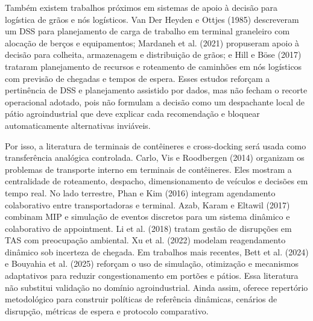 \documentclass[
  12pt,
  oneside,
  a4paper,
  sumario=tradicional,
  brazil
]{abntex2}
\begin{document}
Tamb\'em existem trabalhos pr\'oximos em sistemas de apoio \`a decis\~ao para log\'istica de gr\~aos e n\'os log\'isticos. Van Der Heyden e Ottjes (1985) descreveram um DSS para planejamento de carga de trabalho em terminal graneleiro com aloca\c{c}\~ao de ber\c{c}os e equipamentos; Mardaneh et al. (2021) propuseram apoio \`a decis\~ao para colheita, armazenagem e distribui\c{c}\~ao de gr\~aos; e Hill e B\"ose (2017) trataram planejamento de recursos e roteamento de caminh\~oes em n\'os log\'isticos com previs\~ao de chegadas e tempos de espera. Esses estudos refor\c{c}am a pertin\^encia de DSS e planejamento assistido por dados, mas n\~ao fecham o recorte operacional adotado, pois n\~ao formulam a decis\~ao como um despachante local de p\'atio agroindustrial que deve explicar cada recomenda\c{c}\~ao e bloquear automaticamente alternativas invi\'aveis.

Por isso, a literatura de terminais de cont\^eineres e cross-docking ser\'a usada como transfer\^encia anal\'ogica controlada. Carlo, Vis e Roodbergen (2014) organizam os problemas de transporte interno em terminais de cont\^eineres. Eles mostram a centralidade de roteamento, despacho, dimensionamento de ve\'iculos e decis\~oes em tempo real. No lado terrestre, Phan e Kim (2016) integram agendamento colaborativo entre transportadoras e terminal. Azab, Karam e Eltawil (2017) combinam MIP e simula\c{c}\~ao de eventos discretos para um sistema din\^amico e colaborativo de appointment. Li et al. (2018) tratam gest\~ao de disrup\c{c}\~oes em TAS com preocupa\c{c}\~ao ambiental. Xu et al. (2022) modelam reagendamento din\^amico sob incerteza de chegada. Em trabalhos mais recentes, Bett et al. (2024) e Bouyahia et al. (2025) refor\c{c}am o uso de simula\c{c}\~ao, otimiza\c{c}\~ao e mecanismos adaptativos para reduzir congestionamento em port\~oes e p\'atios. Essa literatura n\~ao substitui valida\c{c}\~ao no dom\'inio agroindustrial. Ainda assim, oferece repert\'orio metodol\'ogico para construir pol\'iticas de refer\^encia din\^amicas, cen\'arios de disrup\c{c}\~ao, m\'etricas de espera e protocolo comparativo.
\end{document}
